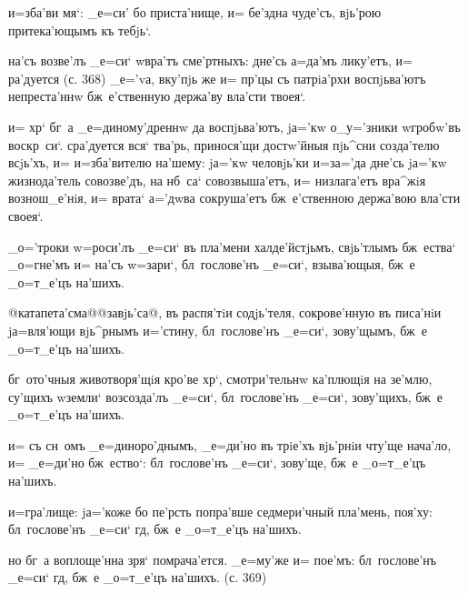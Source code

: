 и=зба'ви мя`: _е=си' бо приста'нище, и= бе'здна чуде'съ, 
вjь'рою притека'ющымъ къ тебjь`.


на'съ возве'лъ _е=си` w\т вра'тъ сме'ртныхъ: дне'сь 
а=да'мъ лику'етъ, и= ра'дуется (с. 368) _е='vа, вку'пjь 
же и= пр'цы съ патрiа'рхи воспjьва'ютъ непреста'ннw 
бж~е'ственную держа'ву вла'сти твоея`.

и= хр` бг~а _е=диному'дреннw да воспjьва'ютъ, jа='кw 
о_у='зники w\т гробw'въ воскр~си`. сра'дуется вся` 
тва'рь, принося'щи достw'йныя пjь^сни созда'телю всjь'хъ, 
и= и=зба'вителю на'шему: jа='кw человjь'ки и=з\ъ а='да 
дне'сь jа='кw жизнода'тель совозве'дъ, на нб~са` 
совозвыша'етъ, и= низлага'етъ вра^жiя вознош_е'нiя, и= 
врата` а='дwва сокруша'етъ бж~е'ственною держа'вою 
вла'сти своея`.


_о='троки w=роси'лъ _е=си` въ пла'мени халде'йстjьмъ, 
свjь'тлымъ бж~ества` _о=гне'мъ и= на'съ w=зари`, 
бл~гослове'нъ _е=си`, взыва'ющыя, бж~е _о=т_е'цъ на'шихъ.

@катапета'сма@{@завjь'са@}, въ распя'тiи содjь'теля, 
сокрове'нную въ писа'нiи jа=вля'ющи вjь^рнымъ и='стину, 
бл~гослове'нъ _е=си`, зову'щымъ, бж~е _о=т_е'цъ на'шихъ.

бг~ото'чныя животворя'щiя кро'ве хр`, смотри'тельнw 
ка'плющiя на зе'млю, су'щихъ w\т земли` возсозда'лъ 
_е=си`, бл~гослове'нъ _е=си`, зову'щихъ, бж~е _о=т_е'цъ 
на'шихъ.

и= съ сн~омъ _е=диноро'днымъ, _е=ди'но въ трiе'хъ 
вjь'рнiи чту'ще нача'ло, и= _е=ди'но бж~ество`: 
бл~гослове'нъ _е=си`, зову'ще, бж~е _о=т_е'цъ на'шихъ.


и=гра'лище: jа='коже бо пе'рсть попра'вше седмери'чный 
пла'мень, поя'ху: бл~гослове'нъ _е=си` гд, бж~е 
_о=т_е'цъ на'шихъ.

но бг~а воплоще'нна зря` помрача'ется. _е=му'же и= 
пое'мъ: бл~гослове'нъ _е=си` гд, бж~е _о=т_е'цъ 
на'шихъ. (с. 369)

